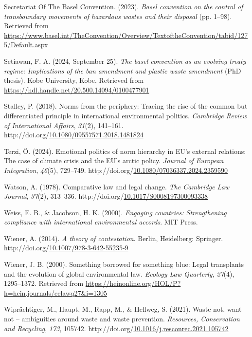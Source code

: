 \documentclass[12pt]{ulaval}
\newenvironment{CSLReferences}%
  {}%
  {\par}
\begin{document}
\begin{CSLReferences}{1}{0}
Secretariat Of The Basel Convention. (2023). \emph{Basel convention on the control of transboundary movements of hazardous wastes and their disposal} (pp. 1--98). Retrieved from \url{https://www.basel.int/TheConvention/Overview/TextoftheConvention/tabid/1275/Default.aspx}

Setiawan, F. A. (2024, September 25). \emph{The basel convention as an evolving treaty regime: Implications of the ban amendment and plastic waste amendment} (PhD thesis). Kobe University, Kobe. Retrieved from \url{https://hdl.handle.net/20.500.14094/0100477901}

Stalley, P. (2018). Norms from the periphery: Tracing the rise of the common but differentiated principle in international environmental politics. \emph{Cambridge Review of International Affairs}, \emph{31}(2), 141--161. http://doi.org/\href{https://doi.org/10.1080/09557571.2018.1481824}{10.1080/09557571.2018.1481824}

Terzi, Ö. (2024). Emotional politics of norm hierarchy in {EU}'s external relations: The case of climate crisis and the {EU}'s arctic policy. \emph{Journal of European Integration}, \emph{46}(5), 729--749. http://doi.org/\href{https://doi.org/10.1080/07036337.2024.2359590}{10.1080/07036337.2024.2359590}

Watson, A. (1978). Comparative law and legal change. \emph{The Cambridge Law Journal}, \emph{37}(2), 313--336. http://doi.org/\href{https://doi.org/10.1017/S0008197300093338}{10.1017/S0008197300093338}

Weiss, E. B., \& Jacobson, H. K. (2000). \emph{Engaging countries: Strengthening compliance with international environmental accords}. {MIT} Press.

Wiener, A. (2014). \emph{A theory of contestation}. Berlin, Heidelberg: Springer. http://doi.org/\href{https://doi.org/10.1007/978-3-642-55235-9}{10.1007/978-3-642-55235-9}

Wiener, J. B. (2000). Something borrowed for something blue: Legal transplants and the evolution of global environmental law. \emph{Ecology Law Quarterly}, \emph{27}(4), 1295--1372. Retrieved from \url{https://heinonline.org/HOL/P?h=hein.journals/eclawq27&i=1305}

Wiprächtiger, M., Haupt, M., Rapp, M., \& Hellweg, S. (2021). Waste not, want not -- ambiguities around waste and waste prevention. \emph{Resources, Conservation and Recycling}, \emph{173}, 105742. http://doi.org/\href{https://doi.org/10.1016/j.resconrec.2021.105742}{10.1016/j.resconrec.2021.105742}

\end{CSLReferences}


\end{document}
